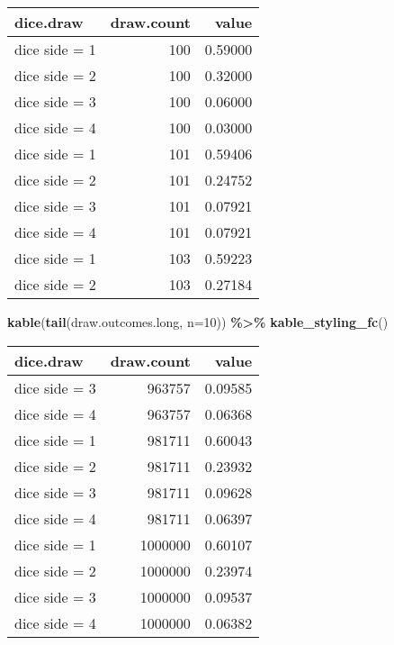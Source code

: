 \documentclass[
]{book}
\newenvironment{Shaded}{\begin{snugshade}}{\end{snugshade}}
\newcommand{\DataTypeTok}[1]{\textcolor[rgb]{0.13,0.29,0.53}{#1}}
\newcommand{\DecValTok}[1]{\textcolor[rgb]{0.00,0.00,0.81}{#1}}
\newcommand{\KeywordTok}[1]{\textcolor[rgb]{0.13,0.29,0.53}{\textbf{#1}}}
\newcommand{\NormalTok}[1]{#1}
\newcommand{\OperatorTok}[1]{\textcolor[rgb]{0.81,0.36,0.00}{\textbf{#1}}}
\newcommand{\StringTok}[1]{\textcolor[rgb]{0.31,0.60,0.02}{#1}}
\begin{document}
\begin{table}[!h]
\centering
\begin{tabular}{l|r|r}
\hline
dice.draw & draw.count & value\\
\hline
\rowcolor{gray!6}  dice side = 1 & 100 & 0.59000\\
\hline
dice side = 2 & 100 & 0.32000\\
\hline
\rowcolor{gray!6}  dice side = 3 & 100 & 0.06000\\
\hline
dice side = 4 & 100 & 0.03000\\
\hline
\rowcolor{gray!6}  dice side = 1 & 101 & 0.59406\\
\hline
dice side = 2 & 101 & 0.24752\\
\hline
\rowcolor{gray!6}  dice side = 3 & 101 & 0.07921\\
\hline
dice side = 4 & 101 & 0.07921\\
\hline
\rowcolor{gray!6}  dice side = 1 & 103 & 0.59223\\
\hline
dice side = 2 & 103 & 0.27184\\
\hline
\end{tabular}
\end{table}

\begin{Shaded}
\begin{Highlighting}[]
\KeywordTok{kable}\NormalTok{(}\KeywordTok{tail}\NormalTok{(draw.outcomes.long, }\DataTypeTok{n=}\DecValTok{10}\NormalTok{)) }\OperatorTok{\%\textgreater{}\%}\StringTok{ }\KeywordTok{kable\_styling\_fc}\NormalTok{()}
\end{Highlighting}
\end{Shaded}

\begin{table}[!h]
\centering
\begin{tabular}{l|r|r}
\hline
dice.draw & draw.count & value\\
\hline
\rowcolor{gray!6}  dice side = 3 & 963757 & 0.09585\\
\hline
dice side = 4 & 963757 & 0.06368\\
\hline
\rowcolor{gray!6}  dice side = 1 & 981711 & 0.60043\\
\hline
dice side = 2 & 981711 & 0.23932\\
\hline
\rowcolor{gray!6}  dice side = 3 & 981711 & 0.09628\\
\hline
dice side = 4 & 981711 & 0.06397\\
\hline
\rowcolor{gray!6}  dice side = 1 & 1000000 & 0.60107\\
\hline
dice side = 2 & 1000000 & 0.23974\\
\hline
\rowcolor{gray!6}  dice side = 3 & 1000000 & 0.09537\\
\hline
dice side = 4 & 1000000 & 0.06382\\
\hline
\end{tabular}
\end{table}
\end{document}
